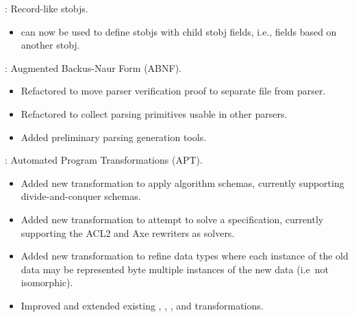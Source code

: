 
\begin{frame}

\implibtitle

:
Record-like stobjs.
\begin{itemize}
\item {} can now be used to define stobjs with child
      stobj fields, i.e., fields based on another stobj.
\end{itemize}

\end{frame}


\begin{frame}

\implibtitle

:
Augmented Backus-Naur Form (ABNF).
\begin{itemize}
\item Refactored to move parser verification proof to separate file from parser.
\item Refactored to collect parsing primitives usable in other parsers.
\item Added preliminary parsing generation tools.
\end{itemize}

\end{frame}


\begin{frame}

\implibtitle

:
Automated Program Transformations (APT).
\begin{itemize}
\item Added new  transformation to apply algorithm schemas,
      currently supporting divide-and-conquer schemas.
\item Added new  transformation to attempt to solve a specification,
      currently supporting the ACL2 and Axe rewriters as solvers.
\item Added new  transformation to refine data types
      where each instance of the old data may be represented byte
      multiple instances of the new data (i.e\ not isomorphic).
\item Improved and extended existing
      , , , and 
      transformations.
\end{itemize}

\end{frame}

